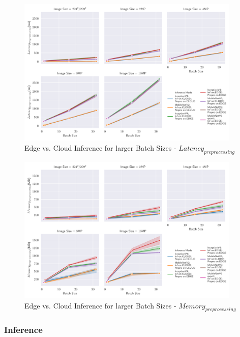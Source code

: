 \begin{figure}[H]
\centering
\includegraphics[width=0.95\textwidth]{./Bilder/single_plots/batch_size_plots/Effects_of_Batch_size_Preprocessing_Latencies.pdf}
\caption{Edge vs. Cloud Inference for larger Batch Sizes -  $Latency_{preprocessing}$}
\label{fig:BatchSizePreproLatency}
\end{figure}
\begin{figure}[H]
\centering
\includegraphics[width=0.95\textwidth]{./Bilder/single_plots/batch_size_plots/Effects_of_Batch_size_Preprocessing_Memory.pdf}
\caption{Edge vs. Cloud Inference for larger Batch Sizes -  $Memory_{preprocessing}$}
\label{fig:BatchSizePreproMemory}
\end{figure}


\subsubsection{Inference}

